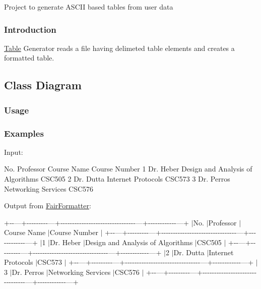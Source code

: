 Project to generate A\+S\+C\+I\+I based tables from user data

\subsubsection*{Introduction}

\hyperlink{classTable}{Table} Generator reads a file having delimeted table elements and creates a formatted table.

\subsection*{Class Diagram}

\subsubsection*{Usage}

\subsubsection*{Examples}

Input\+:

No. Professor Course Name Course Number 1 Dr. Heber Design and Analysis of Algorithms C\+S\+C505 2 Dr. Dutta Internet Protocols C\+S\+C573 3 Dr. Perros Networking Services C\+S\+C576

Output from \hyperlink{classFairFormatter}{Fair\+Formatter}\+:

+-\/-\/---+-\/-\/-\/-\/-\/-\/-\/-\/-\/---+-\/-\/-\/-\/-\/-\/-\/-\/-\/-\/-\/-\/-\/-\/-\/-\/-\/-\/-\/-\/-\/-\/-\/-\/-\/-\/-\/-\/-\/-\/-\/-\/---+-\/-\/-\/-\/-\/-\/-\/-\/-\/-\/-\/-\/---+ $\vert$\+No. $\vert$\+Professor $\vert$\+Course Name $\vert$\+Course Number $\vert$ +-\/-\/---+-\/-\/-\/-\/-\/-\/-\/-\/-\/---+-\/-\/-\/-\/-\/-\/-\/-\/-\/-\/-\/-\/-\/-\/-\/-\/-\/-\/-\/-\/-\/-\/-\/-\/-\/-\/-\/-\/-\/-\/-\/-\/---+-\/-\/-\/-\/-\/-\/-\/-\/-\/-\/-\/-\/---+ $\vert$1 $\vert$\+Dr. Heber $\vert$\+Design and Analysis of Algorithms $\vert$\+C\+S\+C505 $\vert$ +-\/-\/---+-\/-\/-\/-\/-\/-\/-\/-\/-\/---+-\/-\/-\/-\/-\/-\/-\/-\/-\/-\/-\/-\/-\/-\/-\/-\/-\/-\/-\/-\/-\/-\/-\/-\/-\/-\/-\/-\/-\/-\/-\/-\/---+-\/-\/-\/-\/-\/-\/-\/-\/-\/-\/-\/-\/---+ $\vert$2 $\vert$\+Dr. Dutta $\vert$\+Internet Protocols $\vert$\+C\+S\+C573 $\vert$ +-\/-\/---+-\/-\/-\/-\/-\/-\/-\/-\/-\/---+-\/-\/-\/-\/-\/-\/-\/-\/-\/-\/-\/-\/-\/-\/-\/-\/-\/-\/-\/-\/-\/-\/-\/-\/-\/-\/-\/-\/-\/-\/-\/-\/---+-\/-\/-\/-\/-\/-\/-\/-\/-\/-\/-\/-\/---+ $\vert$3 $\vert$\+Dr. Perros $\vert$\+Networking Services $\vert$\+C\+S\+C576 $\vert$ +-\/-\/---+-\/-\/-\/-\/-\/-\/-\/-\/-\/---+-\/-\/-\/-\/-\/-\/-\/-\/-\/-\/-\/-\/-\/-\/-\/-\/-\/-\/-\/-\/-\/-\/-\/-\/-\/-\/-\/-\/-\/-\/-\/-\/---+-\/-\/-\/-\/-\/-\/-\/-\/-\/-\/-\/-\/---+

